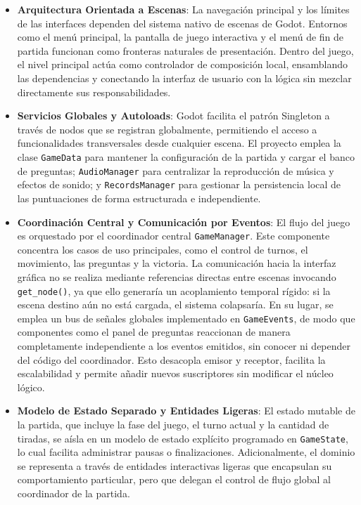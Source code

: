 \begin{itemize}
    \item \textbf{Arquitectura Orientada a Escenas}: La navegación principal y los límites de las interfaces dependen del sistema nativo de escenas de Godot. Entornos como el menú principal, la pantalla de juego interactiva y el menú de fin de partida funcionan como fronteras naturales de presentación. Dentro del juego, el nivel principal actúa como controlador de composición local, ensamblando las dependencias y conectando la interfaz de usuario con la lógica sin mezclar directamente sus responsabilidades.
    
    \item \textbf{Servicios Globales y Autoloads}: Godot facilita el patrón Singleton a través de nodos que se registran globalmente, permitiendo el acceso a funcionalidades transversales desde cualquier escena. El proyecto emplea la clase \texttt{GameData} para mantener la configuración de la partida y cargar el banco de preguntas; \texttt{AudioManager} para centralizar la reproducción de música y efectos de sonido; y \texttt{RecordsManager} para gestionar la persistencia local de las puntuaciones de forma estructurada e independiente.
    
    \item \textbf{Coordinación Central y Comunicación por Eventos}: El flujo del juego es orquestado por el coordinador central \texttt{GameManager}. Este componente concentra los casos de uso principales, como el control de turnos, el movimiento, las preguntas y la victoria. La comunicación hacia la interfaz gráfica no se realiza mediante referencias directas entre escenas invocando \texttt{get\_node()}, ya que ello generaría un acoplamiento temporal rígido: si la escena destino aún no está cargada, el sistema colapsaría. En su lugar, se emplea un bus de señales globales implementado en \texttt{GameEvents}, de modo que componentes como el panel de preguntas reaccionan de manera completamente independiente a los eventos emitidos, sin conocer ni depender del código del coordinador. Esto desacopla emisor y receptor, facilita la escalabilidad y permite añadir nuevos suscriptores sin modificar el núcleo lógico.
    
    \item \textbf{Modelo de Estado Separado y Entidades Ligeras}: El estado mutable de la partida, que incluye la fase del juego, el turno actual y la cantidad de tiradas, se aísla en un modelo de estado explícito programado en \texttt{GameState}, lo cual facilita administrar pausas o finalizaciones. Adicionalmente, el dominio se representa a través de entidades interactivas ligeras que encapsulan su comportamiento particular, pero que delegan el control de flujo global al coordinador de la partida.
\end{itemize}

